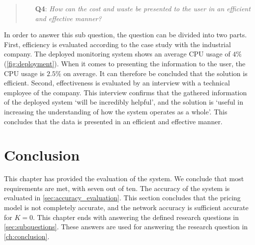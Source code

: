 \begin{quote}
    \begin{itemize}
        \item[\textbf{Q4}: ]\textit{How can the cost and waste be presented to the user in an efficient and effective manner?}
    \end{itemize}
\end{quote}
\noindent
In order to answer this sub question, the question can be divided into two parts. First,  efficiency is evaluated according to the case study with the industrial company. The deployed monitoring system shows an average CPU usage of $4\%$ (\autoref{fig:deployment}). When it comes to presenting the information to the user, the CPU usage is $2.5\%$ on average. It can therefore be concluded that the solution is efficient. Second, effectiveness is evaluated by an interview with a technical employee of the company. This interview confirms that the gathered information of the deployed system `will be incredibly helpful', and the solution is `useful in increasing the understanding of how the system operates as a whole'. This concludes that the data is presented in an efficient and effective manner.

\section{Conclusion}
This chapter has provided the evaluation of the system. We conclude that most requirements are met, with seven out of ten. The accuracy of the system is evaluated in \autoref{sec:accuracy_evaluation}. This section concludes that the pricing model is not completely accurate, and the network accuracy is sufficient accurate for $K = 0$. This chapter ends with answering the defined research questions in \autoref{sec:subquestions}. These answers are used for answering the research question in \autoref{ch:conclusion}.